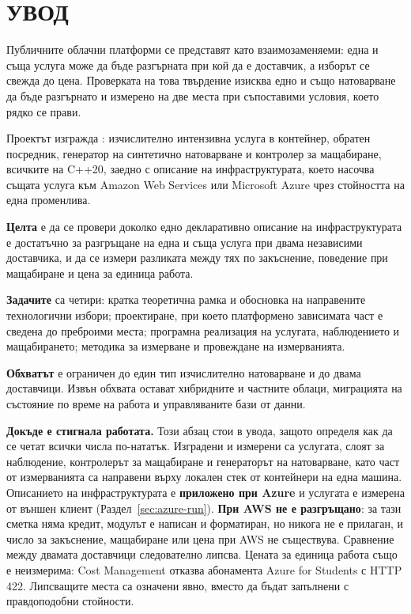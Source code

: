 \section*{УВОД}
\label{sec:introduction}

Публичните облачни платформи се представят като взаимозаменяеми: една и съща услуга
може да бъде разгърната при кой да е доставчик, а изборът се свежда до цена. Проверката
на това твърдение изисква едно и също натоварване да бъде разгърнато и измерено на две
места при съпоставими условия, което рядко се прави.

Проектът изгражда : изчислително интензивна услуга в контейнер, обратен
посредник, генератор на синтетично натоварване и контролер за мащабиране, всичките на
C++20, заедно с описание на инфраструктурата, което насочва същата услуга към Amazon Web
Services или Microsoft Azure чрез стойността на една променлива.

\textbf{Целта} е да се провери доколко едно декларативно описание на инфраструктурата е
достатъчно за разгръщане на една и съща услуга при двама независими доставчика, и да се
измери разликата между тях по закъснение, поведение при мащабиране и цена за единица
работа.

\textbf{Задачите} са четири: кратка теоретична рамка и обосновка на направените
технологични избори; проектиране, при което платформено зависимата част е сведена до
преброими места; програмна реализация на услугата, наблюдението и мащабирането;
методика за измерване и провеждане на измерванията.

\textbf{Обхватът} е ограничен до един тип изчислително натоварване и до двама доставчици.
Извън обхвата остават хибридните и частните облаци, миграцията на състояние по време на
работа и управляваните бази от данни.

\textbf{Докъде е стигнала работата.} Този абзац стои в увода, защото определя как да се
четат всички числа по-нататък. Изградени и измерени са услугата, слоят за наблюдение,
контролерът за мащабиране и генераторът на натоварване, като част от измерванията са
направени върху локален стек от контейнери на една машина. Описанието на инфраструктурата
е \textbf{приложено при Azure} и услугата е измерена от външен клиент
(Раздел~\ref{sec:azure-run}). \textbf{При AWS не е разгръщано}: за тази сметка няма кредит,
модулът е написан и форматиран, но никога не е прилаган, и число за закъснение,
мащабиране или цена при AWS не съществува. Сравнение между двамата доставчици следователно
липсва. Цената за единица работа също е неизмерима: Cost Management отказва абонамента
Azure for Students с HTTP 422. Липсващите места са означени явно, вместо да бъдат
запълнени с правдоподобни стойности.

